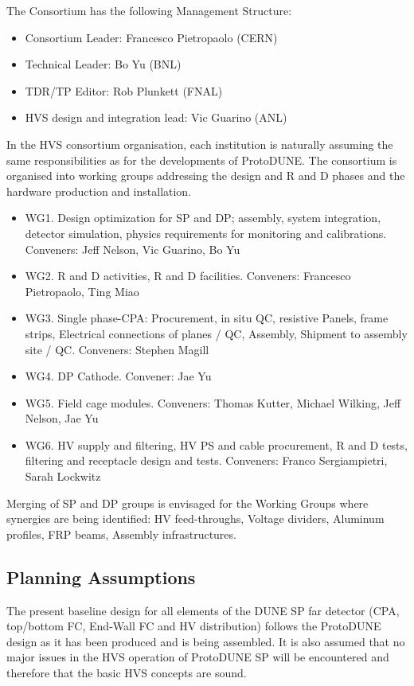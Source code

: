 The Consortium has the following Management Structure:
\begin{itemize}
 \item Consortium Leader: Francesco Pietropaolo (CERN)
 \item Technical Leader: Bo Yu (BNL)
 \item TDR/TP Editor: Rob Plunkett (FNAL)
 \item HVS design and integration lead: Vic Guarino (ANL)
\end{itemize}

In the HVS consortium organisation, each institution is naturally assuming the same responsibilities as for the developments of ProtoDUNE. The consortium is organised into working groups addressing the design and  R and D phases and the hardware production and installation.

\begin{itemize}
\item WG1. Design optimization for SP and DP; assembly, system integration, detector simulation, physics requirements for monitoring and calibrations. Conveners: Jeff Nelson, Vic Guarino, Bo Yu
\item WG2. R and D activities, R and D facilities. Conveners: Francesco Pietropaolo, Ting Miao
\item WG3. Single phase-CPA: Procurement, in situ QC, resistive Panels, frame strips, Electrical connections of planes / QC, Assembly, Shipment to assembly site / QC. Conveners: Stephen Magill
\item WG4. DP Cathode. Convener: Jae Yu
\item WG5. Field cage modules. Conveners: Thomas Kutter, Michael Wilking, Jeff Nelson, Jae Yu
\item WG6. HV supply and filtering, HV PS and cable procurement, R and D tests, filtering and receptacle design and tests. Conveners: Franco Sergiampietri, Sarah Lockwitz
\end{itemize}

\noindent Merging of SP and DP groups is envisaged for the Working Groups where synergies are being identified: HV feed-throughs, Voltage dividers, Aluminum profiles, FRP beams, Assembly infrastructures.

\subsection{Planning Assumptions}
\label{sec:fdsp-hv-org-assmp}
The present baseline design for all elements of the DUNE SP far detector (CPA, top/bottom FC, End-Wall FC and HV distribution) follows the ProtoDUNE design as it has been produced and is being assembled.  It is also assumed that no major issues in the HVS operation of ProtoDUNE SP will be encountered and therefore that the basic HVS concepts are sound.

